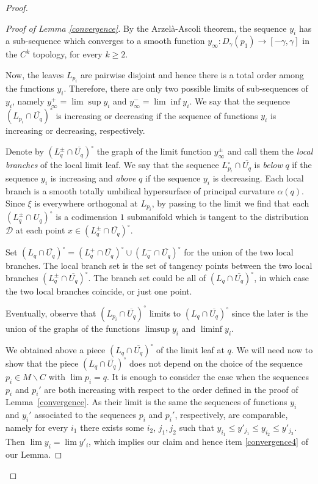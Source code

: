 \documentclass[10pt]{amsart}
\let\mathcal\mathscr
\let\moins\smallsetminus
\theoremstyle{definition}
\theoremstyle{remark}
\numberwithin{equation}{section}
\begin{document}
\begin{proof}
\begin{proof}[Proof of Lemma \ref{convergence}]
By the Arzelà-Ascoli theorem, the sequence $y_i$ has a sub-sequence which converges to a smooth function $y_{\infty}: D_{\gamma}(p_1)\to [-\gamma,\gamma]$ in the $C^{k}$ topology, for every $k\geq 2$.

Now, the leaves $L_{p_i}$ are pairwise disjoint and hence
there is a total order among the functions $y_i$. Therefore, there are only two possible limits of sub-sequences of $y_i$, namely
$y_{\infty}^+=\lim\sup y_i$ and $y_{\infty}^-=\lim\inf y_i$.
We say that the sequence $(L_{p_i}\cap \overline{U_q})^{\circ}$ is increasing or decreasing if the sequence of functions $y_i$ is increasing or decreasing, respectively.

Denote by $(L_q^{\pm}\cap \overline{U_q})^{\circ}$ the graph of the limit function $y^{\pm}_{\infty}$ and call them the \emph{local branches} of the local limit leaf. We say that the sequence $L_{p_i}^{\circ}\cap \overline{U_q}$ is \emph{below} $q$ if
the sequence $y_i$ is increasing and \emph{above} $q$ if the sequence $y_i$ is decreasing.
Each local branch is a smooth totally umbilical hypersurface of principal curvature $\alpha(q)$.
Since $\xi$ is everywhere orthogonal at $L_{p_i}$, by passing to the limit we find that each $(L_q^{\pm}\cap U_q)^{\circ}$ is a codimension $1$ submanifold which is tangent to the distribution $\mathcal D$ at each point $x\in (L_q^{\pm}\cap \overline{U_q})^{\circ}$.

Set $(L_q\cap \overline{U_q})^{\circ}=(L_q^{+}\cap \overline{U_q})^{\circ}\cup (L_q^{-}\cap \overline{U_q})^{\circ}$ for the union of the two local branches.
The local branch set is the set of tangency points between
the two local branches $(L_q^{\pm}\cap \overline{U_q})^{\circ}$. The branch set could be all of $(L_q\cap \overline{U_q})^{\circ}$, in which case the two local branches coincide, or just one point.

Eventually, observe that $(L_{p_i}\cap \overline{U_q})^{\circ}$ limits to $(L_q\cap \overline{U_q})^{\circ}$ since the later is
the union of the graphs of the functions $\limsup y_i$ and $\liminf y_i$.

We obtained above a piece $(L_q\cap \overline{U_q})^{\circ}$ of the limit leaf at $q$. We will need now to show that
the piece $(L_q\cap \overline{U_q})^{\circ}$ does not depend on the choice of the sequence $p_i\in M\moins C$ with $\lim p_i=q$.
It is enough to consider the case when the sequences $p_i$ and $p_i'$ are both increasing
with respect to the order defined in the proof of Lemma~\ref{convergence}. As their limit is the same the sequences of functions $y_i$ and $y_i'$
associated to the sequences $p_i$ and $p_i'$, respectively, are comparable, namely for every $i_1$ there exists some $i_2$, $j_1,j_2$ such that
$y_{i_1} \leq y'_{j_1} \leq y_{i_2}\leq y'_{j_2}$. Then $\lim y_i=\lim y'_i$, which implies our claim and hence item \eqref{convergence4} of our Lemma.


\end{proof}
\end{proof}
\end{document}
